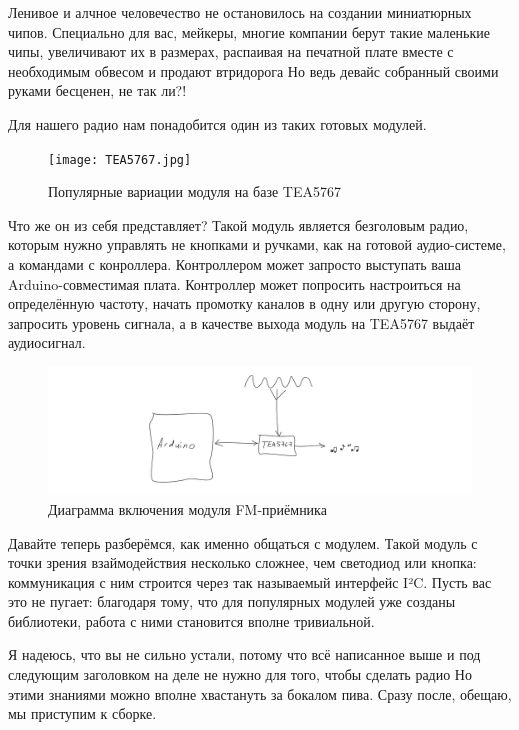 Ленивое и алчное человечество не остановилось на создании миниатюрных чипов. Специально для вас, мейкеры, многие компании берут такие маленькие чипы, увеличивают их в размерах, распаивая на печатной плате вместе с необходимым обвесом и продают втридорога  Но ведь девайс собранный своими руками бесценен, не так ли?!

Для нашего радио нам понадобится один из таких готовых модулей.

\begin{figure}
  \centering
  \texttt{[image: TEA5767.jpg]}
  \caption{Популярные вариации модуля на базе TEA5767}
\end{figure}

Что же он из себя представляет? Такой модуль является безголовым радио, которым нужно управлять не кнопками и ручками, как на готовой аудио-системе, а командами с конроллера. Контроллером может запросто выступать ваша Arduino-совместимая плата. Контроллер может попросить настроиться на определённую частоту, начать промотку каналов в одну или другую сторону, запросить уровень сигнала, а в качестве выхода модуль на TEA5767 выдаёт аудиосигнал.

\begin{figure}
  \centering
  \includegraphics{sketches/fm-receiver-diagram}
  \caption{Диаграмма включения модуля FM-приёмника}
\end{figure}

Давайте теперь разберёмся, как именно общаться с модулем. Такой модуль с точки зрения взаймодействия несколько сложнее, чем светодиод или кнопка: коммуникация с ним строится через так называемый интерфейс I²C. Пусть вас это не пугает: благодаря тому, что для популярных модулей уже созданы библиотеки, работа с ними становится вполне тривиальной.

\begin{Note}
  Я надеюсь, что вы не сильно устали, потому что всё написанное выше и под следующим заголовком на деле не нужно для того, чтобы сделать радио  Но этими знаниями можно вполне хвастануть за бокалом пива. Сразу после, обещаю, мы приступим к сборке.
\end{Note}

